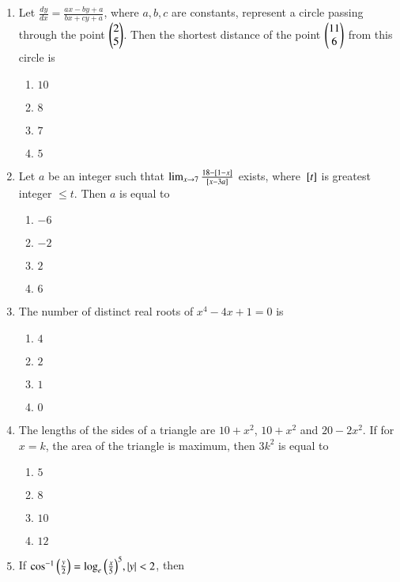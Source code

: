 \documentclass[journal,onecolumn]{IEEEtran}
\theoremstyle{remark}
\begin{document}
\begin{enumerate}
    \item Let $\frac{dy}{dx} = \frac{ax - by + a}{bx + cy + a}$, where $a, b, c$ are constants, represent a circle passing through the point $\begin{pmatrix}2\\5\end{pmatrix}$. Then the shortest distance of the point $\begin{pmatrix}11\\6\end{pmatrix}$ from this circle is 

	\begin{enumerate}
		\item $10$ 
		\item $8$
		\item $7$
		\item $5$
	\end{enumerate}

    \item Let $a$ be an integer such thtat $\lim_{x \to 7} \frac{18 - {}\left[1 - x\right]}{{}\left[x - 3a\right]}$ exists, where ${}\left[t\right]$ is greatest integer $\leq t$. Then $a$ is equal to

	\begin{enumerate}
		\item $-6$ 
		\item $-2$
		\item $2$
		\item $6$
	\end{enumerate}

    \item The number of distinct real roots of $x^4 - 4x + 1 = 0$ is

	\begin{enumerate}
		\item $4$ 
		\item $2$
		\item $1$
		\item $0$
	\end{enumerate}


    \item The lengths of the sides of a triangle are $10 + x^2$, $10 + x^2$ and $20 - 2x^2$. If for $x = k$, the area of the triangle is maximum, then $3k^2$ is equal to

	\begin{enumerate}
		\item $5$ 
		\item $8$
		\item $10$
		\item $12$
	\end{enumerate}

    \item If $\cos^{-1}{\left(\frac{y}{2}\right)} = \log_{e}{\left(\frac{x}{5}\right)}^{5}, \left\vert y\right\vert < 2$, then


\end{enumerate}
\end{document}
